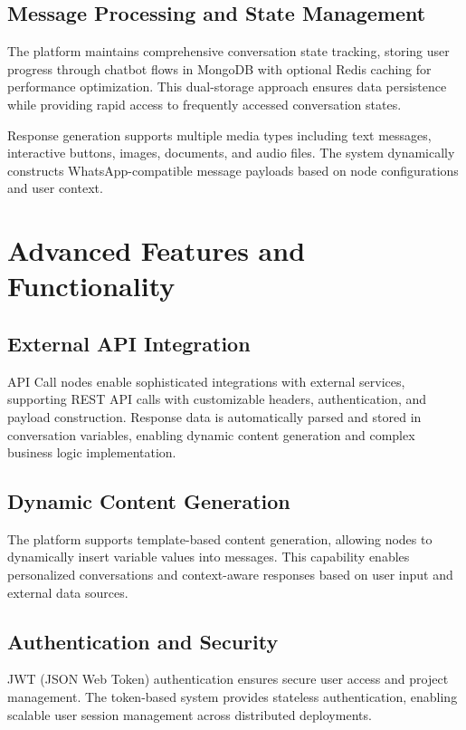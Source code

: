 \documentclass[conference]{IEEEtran}
\begin{document}
\subsection{Message Processing and State Management}

The platform maintains comprehensive conversation state tracking, storing user progress through chatbot flows in MongoDB with optional Redis caching for performance optimization. This dual-storage approach ensures data persistence while providing rapid access to frequently accessed conversation states.

Response generation supports multiple media types including text messages, interactive buttons, images, documents, and audio files. The system dynamically constructs WhatsApp-compatible message payloads based on node configurations and user context.

\section{Advanced Features and Functionality}

\subsection{External API Integration}

API Call nodes enable sophisticated integrations with external services, supporting REST API calls with customizable headers, authentication, and payload construction. Response data is automatically parsed and stored in conversation variables, enabling dynamic content generation and complex business logic implementation.

\subsection{Dynamic Content Generation}

The platform supports template-based content generation, allowing nodes to dynamically insert variable values into messages. This capability enables personalized conversations and context-aware responses based on user input and external data sources.

\subsection{Authentication and Security}

JWT (JSON Web Token) authentication ensures secure user access and project management. The token-based system provides stateless authentication, enabling scalable user session management across distributed deployments.
\end{document}
